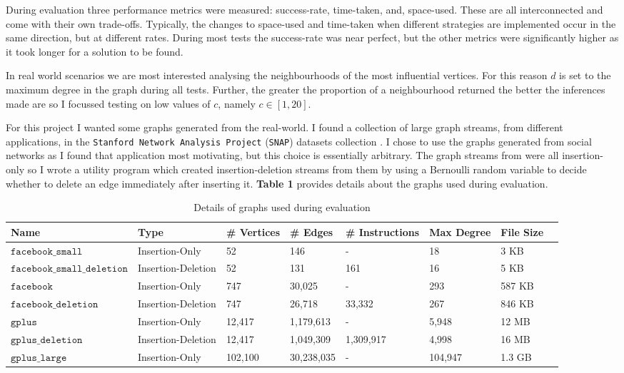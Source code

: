 \documentclass[11pt,twoside,a4paper]{report}
\begin{document}

During evaluation three performance metrics were measured: success-rate, time-taken, and, space-used. These are all interconnected and come with their own trade-offs. Typically, the changes to space-used and time-taken when different strategies are implemented occur in the same direction, but at different rates. During most tests the success-rate was near perfect, but the other metrics were significantly higher as it took longer for a solution to be found.

\par In real world scenarios we are most interested analysing the neighbourhoods of the most influential vertices. For this reason $d$ is set to the maximum degree in the graph during all tests. Further, the greater the proportion of a neighbourhood returned the better the inferences made are so I focussed testing on low values of $c$, namely $c\in[1,20]$.

\par For this project I wanted some graphs generated from the real-world. I found a collection of large graph streams, from different applications, in the \texttt{Stanford Network Analysis Project} (\texttt{SNAP}) datasets collection \cite{SNAP}. I chose to use the graphs generated from social networks as I found that application most motivating, but this choice is essentially arbitrary. The graph streams from \cite{SNAP} were all insertion-only so I wrote a utility program which created insertion-deletion streams from them by using a Bernoulli random variable to decide whether to delete an edge immediately after inserting it. \textbf{Table 1} provides details about the graphs used during evaluation.

\begin{center}
	\begin{table}[h]
		\tiny
		\begin{tabular}{|l|l|l|l|l|l|l|l|}
			\hline
			\textbf{Name}&\textbf{Type}&\textbf{\# Vertices}&\textbf{\# Edges}&\textbf{\# Instructions}&\textbf{Max Degree}&\textbf{File Size}\\
			\hline
			$\mathtt{facebook\_small}$&Insertion-Only&52&146&-&18&3 KB\\
			$\mathtt{facebook\_small\_deletion}$&Insertion-Deletion&52&131&161&16&5 KB\\
			$\mathtt{facebook}$&Insertion-Only&747&30,025&-&293&587 KB\\
			$\mathtt{facebook\_deletion}$&Insertion-Deletion&747&26,718&33,332&267&846 KB\\
			$\mathtt{gplus}$&Insertion-Only&12,417&1,179,613&-&5,948&12 MB\\
			$\mathtt{gplus\_deletion}$&Insertion-Deletion&12,417&1,049,309&1,309,917&4,998&16 MB\\
			$\mathtt{gplus\_large}$&Insertion-Only&102,100&30,238,035&-&104,947&1.3 GB\\
			\hline
		\end{tabular}
    \caption{Details of graphs used during evaluation}
	\end{table}
\end{center}
\end{document}
